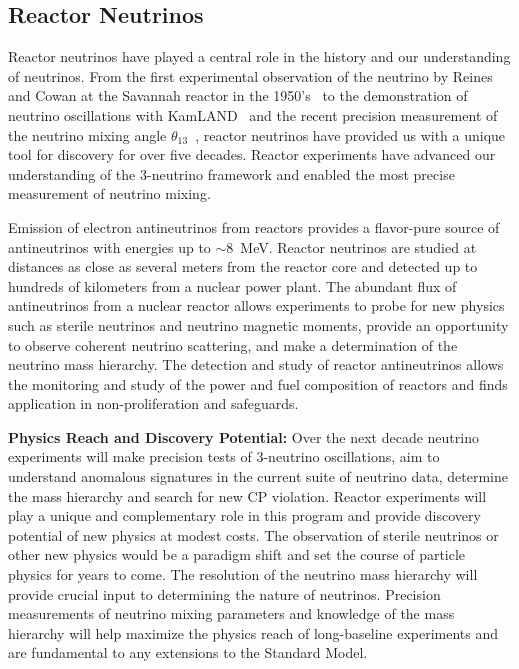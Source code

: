 \pagebreak
\subsection{Reactor Neutrinos}
\label{sec:Reactor}

Reactor neutrinos have played a central role in the history and our
understanding of neutrinos.  From the first experimental observation
of the neutrino by Reines and Cowan at the Savannah reactor in the
1950's~\cite{Reines:1960pr} to the demonstration of neutrino
oscillations with KamLAND~\cite{Abe:2008aa} and the recent precision
measurement of the neutrino mixing angle
$\theta_{13}$~\cite{Abe:2012tg, An:2013zwz}, reactor neutrinos have
provided us with a unique tool for discovery for over five
decades. Reactor experiments have advanced our understanding of the
3-neutrino framework and enabled the most precise measurement of
neutrino mixing.

Emission of electron antineutrinos from reactors provides a
flavor-pure source of antineutrinos with energies up to $\sim$8~MeV. 
Reactor neutrinos are studied at distances as close as several
meters from the reactor core and detected up to hundreds of kilometers
from a nuclear power plant.  The abundant flux of antineutrinos from a
nuclear reactor allows experiments to probe for new physics such as
sterile neutrinos and neutrino magnetic moments, provide an
opportunity to observe coherent neutrino scattering, and make a
determination of the neutrino mass hierarchy. The detection and study
of reactor antineutrinos allows the monitoring and study of the power
and fuel composition of reactors and finds application in
non-proliferation and safeguards.

{\bf Physics Reach and Discovery Potential:}
Over the next decade neutrino experiments will make precision tests of
3-neutrino oscillations, aim to understand anomalous signatures in the
current suite of neutrino data, determine the mass hierarchy and
search for new CP violation. Reactor experiments will play a unique
and complementary role in this program and provide discovery potential
of new physics at modest costs. The observation of sterile neutrinos
or other new physics would be a paradigm shift and set the course of
particle physics for years to come.  The resolution of the neutrino
mass hierarchy will provide crucial input to determining the nature of
neutrinos.  Precision measurements of neutrino mixing parameters and
knowledge of the mass hierarchy will help maximize the physics reach
of long-baseline experiments and are fundamental to any extensions to
the Standard Model.

